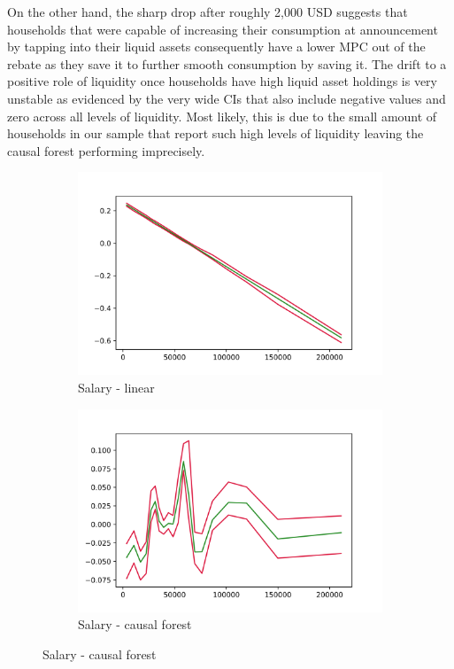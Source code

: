 On the other hand, the sharp drop after roughly 2,000 USD suggests that households that were capable of increasing their consumption at announcement by tapping into their liquid assets consequently have a lower MPC out of the rebate as they save it to further smooth consumption by saving it. The drift to a positive role of liquidity once households have high liquid asset holdings is very unstable as evidenced by the very wide CIs that also include negative values and zero across all levels of liquidity. Most likely, this is due to the small amount of households in our sample that report such high levels of liquidity leaving the causal forest performing imprecisely. \\
\begin{figure}[t]
    \centering
    \begin{subfigure}{0.5\textwidth}
        \includegraphics[width=\linewidth]{figures/ALE/chNDexp/spec3_linear_FSALARYM.png}
        \caption{Salary - linear}
    \end{subfigure}\hfill
    \begin{subfigure}{0.5\textwidth}
        \includegraphics[width=\linewidth]{figures/ALE/chNDexp/spec3_cf_FSALARYM.png}
        \caption{Salary - causal forest}
    \end{subfigure}\hfill


\end{figure}
